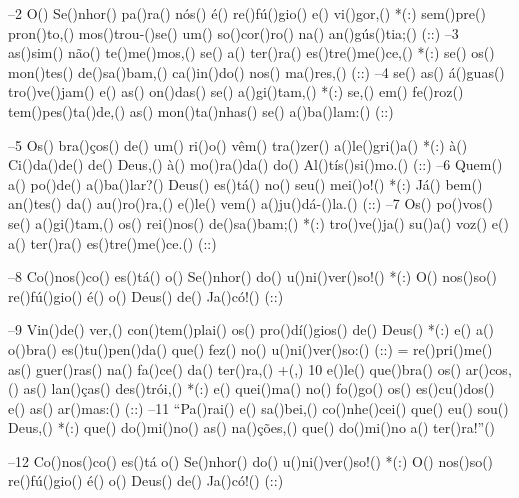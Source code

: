 –2 O() Se()nhor() pa()ra() nós() é() re()fú()gio() e() vi()gor,() *(:)
sem()pre() pron()to,() mos()trou-()se() um() so()cor()ro() na() an()gús()tia;() (::)
–3 as()sim() não() te()me()mos,() se() a() ter()ra() es()tre()me()ce,() *(:)
se() os() mon()tes() de()sa()bam,() ca()in()do() nos() ma()res,() (::)
–4 se() as() á()guas() tro()ve()jam() e() as() on()das() se() a()gi()tam,() *(:)
se,() em() fe()roz() tem()pes()ta()de,() as() mon()ta()nhas() se() a()ba()lam:() (::)

–5 Os() bra()ços() de() um() ri()o() vêm() tra()zer() a()le()gri()a() *(:)
à() Ci()da()de() de() Deus,() à() mo()ra()da() do() Al()tís()si()mo.() (::)
–6 Quem() a() po()de() a()ba()lar?() Deus() es()tá() no() seu() mei()o!() *(:)
Já() bem() an()tes() da() au()ro()ra,() e()le() vem() a()ju()dá-()la.() (::)
–7 Os() po()vos() se() a()gi()tam,() os() rei()nos() de()sa()bam;() *(:)
tro()ve()ja() su()a() voz() e() a() ter()ra() es()tre()me()ce.() (::)

–8 Co()nos()co() es()tá() o() Se()nhor() do() u()ni()ver()so!() *(:)
O() nos()so() re()fú()gio() é() o() Deus() de() Ja()có!() (::)

–9 Vin()de() ver,() con()tem()plai() os() pro()dí()gios() de() Deus() *(:)
e() a() o()bra() es()tu()pen()da() que() fez() no() u()ni()ver()so:() (::)
= re()pri()me() as() guer()ras() na() fa()ce() da() ter()ra,() +(,)
10 e()le() que()bra() os() ar()cos,() as() lan()ças() des()trói,() *(:)
e() quei()ma() no() fo()go() os() es()cu()dos() e() as() ar()mas:() (::)
–11 ``Pa()rai() e() sa()bei,() co()nhe()cei() que() eu() sou() Deus,() *(:)
que() do()mi()no() as() na()ções,() que() do()mi()no a() ter()ra!''()

–12 Co()nos()co() es()tá o() Se()nhor() do() u()ni()ver()so!() *(:)
O() nos()so() re()fú()gio() é() o() Deus() de() Ja()có!() (::)
